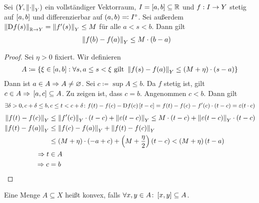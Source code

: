 \begin{satz} %
    \label{satz:mittelwertsatz}
    Sei $\left(Y, \left\lVert\cdot\right\rVert_Y\right)$ ein vollständiger Vektorraum, $I=\left[a,b\right]\subseteq\mathbb{R}$ und $f: I\rightarrow{} Y$ stetig auf $\left[a,b\right]$ und differenzierbar auf $\left(a,b\right)\eqqcolon I^{\circ}$. Sei außerdem $\norm{\D f\of{s}}_{\R\fromto Y} = \norm{f'\of{s}}_Y \leq M$ für alle $a < s < b$. Dann gilt
    \begin{align*}
        \norm{f\of{b}-f\of{a}}_Y &\leq M\cdot\pair{b-a}
    \end{align*}

    \begin{proof}
        Sei $\eta > 0$ fixiert. Wir definieren
        \begin{align*}
            A\coloneqq\set{\xi\in\interv{a,b}: \forall s, a\leq s < \xi\text{ gilt } \norm{f\of{s}-f\of{a}}_{Y} \leq \pair{M+\eta}\cdot\pair{s-a}}
        \end{align*}
        Dann ist $a\in A\Rightarrow{} A\neq \varnothing$. Sei $c\coloneqq \sup A \leq b$. Da $f$ stetig ist, gilt $c\in A \Rightarrow{} \left[a,c\right]\subseteq A$. Zu zeigen ist, dass $c=b$. Angenommen $c<b$. Dann gilt
        \begin{align*}
            \exists\delta > 0, c+\delta \leq b, c\leq t < c+\delta\colon f\of{t} - f\of{c} - \D f\of{c}\interv{t-c} = f\of{t} - f\of{c} - f'\of{c}\cdot\pair{t-c} = \varepsilon\of{t\cdot c}
        \end{align*}
        \begin{align*}
            \norm{f\of{t} - f\of{c}}_Y &\leq \norm{f'\of{c}}_Y \cdot\pair{t-c} + \norm{\varepsilon\of{t-c}}_Y \leq M\cdot\pair{t-c} + \norm{\varepsilon\of{t-c}}_Y\cdot\pair{t-c}\\
            \norm{f\of{t} - f\of{a}}_Y &\leq \norm{f\of{c} - f\of{a}}_Y + \norm{f\of{t} - f\of{c}}_Y\\
            &\leq \pair{M + \eta}\cdot\pair{-a+c} + \pair{M+\frac{\eta}{2}}\pair{t-c} < \pair{M+\eta}\pair{t-a}\\
            \impl t&\in A\\
            \impl c&= b\qedhere
        \end{align*}
    \end{proof}
\end{satz}

\begin{bemerkung}
    Eine Menge $A\subseteq X$ heißt konvex, falls $\forall x,y\in A\colon \left[x,y\right]\subseteq A$.
\end{bemerkung}

